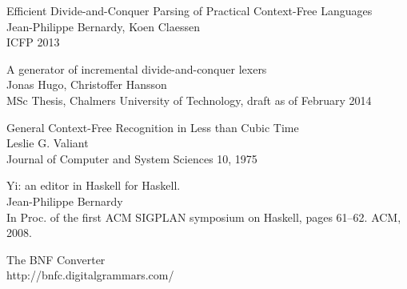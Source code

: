 \documentclass[a4paper,12pt]{article}
\begin{document}
\begin{thebibliography}{9}

    Efficient Divide-and-Conquer Parsing of Practical Context-Free Languages \\
    Jean-Philippe Bernardy, Koen Claessen \\
    ICFP 2013

    A generator of incremental divide-and-conquer lexers \\
    Jonas Hugo, Christoffer Hansson \\
    MSc Thesis, Chalmers University of Technology, draft as of February 2014

    General Context-Free Recognition in Less than Cubic Time \\
    Leslie G. Valiant \\ 
    Journal of Computer and System Sciences 10, 1975

    Yi: an editor in Haskell for Haskell. \\
    Jean-Philippe Bernardy \\
    In Proc. of the first ACM SIGPLAN symposium on Haskell, pages 61–62. ACM,
    2008.

    The BNF Converter \\
    http://bnfc.digitalgrammars.com/

\end{thebibliography}
\end{document}
